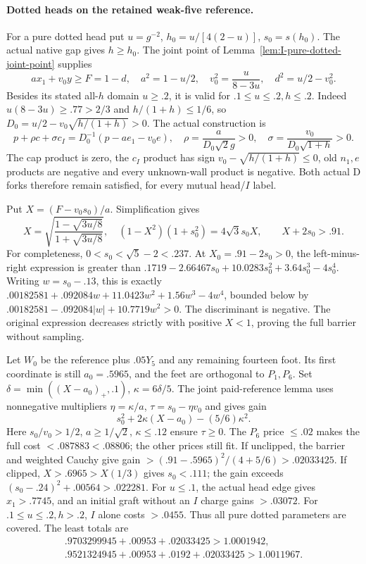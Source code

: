 \documentclass[11pt]{article}
\theoremstyle{definition}
\theoremstyle{remark}
\begin{document}
\paragraph{Dotted heads on the retained weak-five reference.}
For a pure dotted head put \(u=g^{-2}\), \(h_0=u/[4(2-u)]\),
\(s_0=s(h_0)\). The actual native gap gives \(h\ge h_0\). The
joint point of Lemma~\ref{lem:I-pure-dotted-joint-point} supplies
\[
 ax_1+v_0y\ge F=1-d,\quad a^2=1-u/2,\quad
 v_0^2={\frac{u}{8-3u}},\quad d^2=u/2-v_0^2.
\]
Besides its stated all-\(h\) domain \(u\ge.2\), it is valid for
\(.1\le u\le.2,h\le.2\). Indeed \(u(8-3u)\ge.77>2/3\)
and \(h/(1+h)\le1/6\), so
\(D_0=u/2-v_0\sqrt{h/(1+h)}>0\). The actual construction is
\[
 p+\rho c+\sigma c_I=D_0^{-1}(p-ae_1-v_0e),\quad
 \rho={\frac{a}{ D_0\sqrt2g}}>0,\quad
 \sigma={\frac{v_0}{ D_0\sqrt{1+h}}}>0.
\]
The cap product is zero, the \(c_I\) product has sign
\(v_0-\sqrt{h/(1+h)}\le0\), old \(n_1,e\) products are negative
and every unknown-wall product is negative. Both actual D forks
therefore remain satisfied, for every mutual head/\(I\) label.

Put \(X=(F-v_0s_0)/a\). Simplification gives
\[
 X=\sqrt{{\frac{1-\sqrt{3u/8}}{1+\sqrt{3u/8}}}},\quad
 (1-X^2)(1+s_0^2)=4\sqrt3s_0X,\qquad X+2s_0>.91.
\]
For completeness, \(0<s_0<\sqrt5-2<.237\). At
\(X_0=.91-2s_0>0\), the left-minus-right expression is greater than
\(.1719-2.66467s_0+10.0283s_0^2+3.64s_0^3-4s_0^4\).
Writing \(w=s_0-.13\), this is exactly
\(.00182581+.092084w+11.0423w^2+1.56w^3-4w^4\), bounded below
by \(.00182581-.092084|w|+10.7719w^2>0\). The discriminant
is negative. The original expression decreases strictly with
positive \(X<1\), proving the full barrier without sampling.

Let \(W_0\) be the reference plus \(.05Y_5\) and any remaining
fourteen foot. Its first coordinate is still \(a_0=.5965\), and
the feet are orthogonal to \(P_1,P_6\). Set
\(\delta=\min((X-a_0)_+,.1)\), \(\kappa=6\delta/5\).
The joint paid-reference lemma uses nonnegative multipliers
\(\eta=\kappa/a\), \(\tau=s_0-\eta v_0\) and gives gain
\[
 s_0^2+2\kappa(X-a_0)-(5/6)\kappa^2.
\]
Here \(s_0/v_0>1/2\), \(a\ge1/\sqrt2\), \(\kappa\le.12\)
ensure \(\tau\ge0\). The \(P_6\) price \(\le.02\) makes the
full cost \(<.087883<.08806\); the other prices still fit.
If unclipped, the barrier and weighted Cauchy give gain
\(>(.91-.5965)^2/(4+5/6)>.02033425\). If clipped,
\(X>.6965>X(1/3)\) gives \(s_0<.111\); the gain exceeds
\((s_0-.24)^2+.00564>.022281\).
For \(u\le.1\), the actual head edge gives \(x_1>.7745\),
and an initial graft without an \(I\) charge gains \(>.03072\).
For \(.1\le u\le.2,h>.2\), \(I\) alone costs \(>.0455\).
Thus all pure dotted parameters are covered. The least totals are
\[
\begin{gathered}
 .9703299945+.00953+.02033425>1.0001942,\\
 .9521324945+.00953+.0192+.02033425>1.0011967.
\end{gathered}
\]
\end{document}
